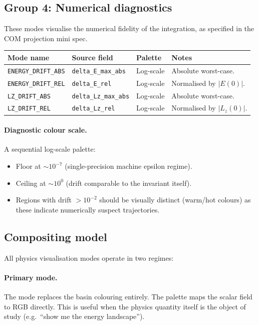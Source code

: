 \documentclass[11pt]{article}
\newcommand{\field}[1]{\texttt{#1}}
\begin{document}
\subsection{Group 4: Numerical diagnostics}

These modes visualise the numerical fidelity of the integration, as specified
in the COM projection mini spec.

\begin{center}
\begin{tabular}{llll}
\toprule
Mode name & Source field & Palette & Notes \\
\midrule
\texttt{ENERGY\_DRIFT\_ABS} & \field{delta\_E\_max\_abs} & Log-scale & Absolute worst-case. \\
\texttt{ENERGY\_DRIFT\_REL} & \field{delta\_E\_rel} & Log-scale & Normalised by $|E(0)|$. \\
\texttt{LZ\_DRIFT\_ABS} & \field{delta\_Lz\_max\_abs} & Log-scale & Absolute worst-case. \\
\texttt{LZ\_DRIFT\_REL} & \field{delta\_Lz\_rel} & Log-scale & Normalised by $|L_z(0)|$. \\
\bottomrule
\end{tabular}
\end{center}

\paragraph{Diagnostic colour scale.} A sequential log-scale palette:
\begin{itemize}[nosep]
    \item Floor at $\sim 10^{-7}$ (single-precision machine epsilon regime).
    \item Ceiling at $\sim 10^{0}$ (drift comparable to the invariant itself).
    \item Regions with drift $> 10^{-2}$ should be visually distinct
          (warm/hot colours) as these indicate numerically suspect trajectories.
\end{itemize}

\subsection{Compositing model}

All physics visualisation modes operate in two regimes:

\paragraph{Primary mode.} The mode replaces the basin colouring entirely. The
palette maps the scalar field to RGB directly. This is useful when the physics
quantity itself is the object of study (e.g.\ ``show me the energy landscape'').
\end{document}
